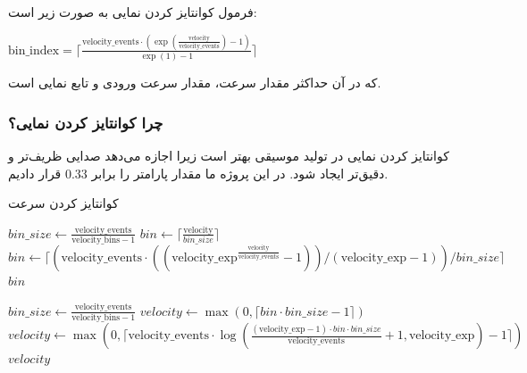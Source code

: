 فرمول کوانتایز کردن نمایی به صورت زیر است:
\begin{LTR}
      \setmainfont{Times New Roman}
      $
            \text{bin\_index} = \lceil \frac{\text{velocity\_events} \cdot (\exp(\frac{\text{velocity}}{\text{velocity\_events}}) - 1)}{\exp(1) - 1} \rceil
      $
\end{LTR}

که در آن  حداکثر مقدار سرعت،  مقدار سرعت ورودی و
 تابع نمایی است.

\subsubsection{چرا کوانتایز کردن
      نمایی؟}
کوانتایز کردن نمایی در تولید موسیقی بهتر است زیرا اجازه می‌دهد صدایی
ظریف‌تر و دقیق‌تر ایجاد شود. در این پروژه ما مقدار پارامتر  را برابر $0.33$ قرار دادیم.

\begin{LTR}
      \begin{algorithm}
            \caption{کوانتایز کردن سرعت}
            \label{alg:velocity_quantization}
            \begin{algorithmic}
                  \setmainfont{Times New Roman}
                  \State $bin\_size \gets \frac{\text{velocity\_events}}{\text{velocity\_bins} - 1}$
                  \State $bin \gets \lceil \frac{\text{velocity}}{bin\_size} \rceil$
                  \Else
                  \State $bin \gets \lceil \left( \text{velocity\_events} \cdot \left( \left( \text{velocity\_exp}^{ \frac{\text{velocity}}{\text{velocity\_events}} } - 1 \right) \right) / (\text{velocity\_exp} - 1) \right) / bin\_size \rceil$
                  \EndIf
                  \State \Return $bin$
                  \EndProcedure

                  \State $bin\_size \gets \frac{\text{velocity\_events}}{\text{velocity\_bins} - 1}$
                  \State $velocity \gets \max(0, \lceil bin \cdot bin\_size - 1 \rceil)$
                  \Else
                  \State $velocity \gets \max(0, \lceil \text{velocity\_events} \cdot \log \left( \frac{(\text{velocity\_exp} - 1) \cdot bin \cdot bin\_size}{\text{velocity\_events}} + 1, \text{velocity\_exp} \right) - 1 \rceil)$
                  \EndIf
                  \State \Return $velocity$
                  \EndProcedure
            \end{algorithmic}
      \end{algorithm}
\end{LTR}

